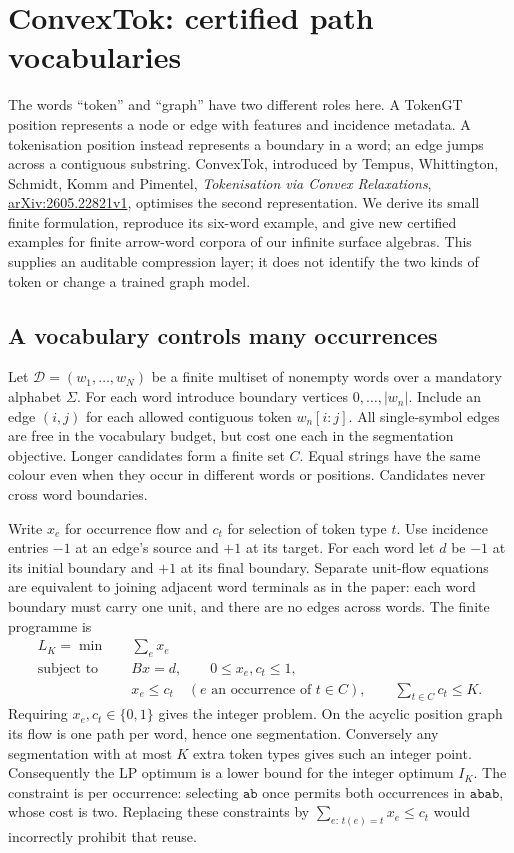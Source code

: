 \section{ConvexTok: certified path vocabularies}
\label{convextok:section}
The words ``token'' and ``graph'' have two different roles here. A TokenGT
position represents a node or edge with features and incidence metadata.
A tokenisation position instead represents a boundary in a word; an edge
jumps across a contiguous substring. ConvexTok, introduced by Tempus,
Whittington, Schmidt, Komm and Pimentel,
\emph{Tokenisation via Convex Relaxations},
\href{https://arxiv.org/html/2605.22821v1}{arXiv:2605.22821v1},
optimises the second representation. We derive its small finite
formulation, reproduce its six-word example, and give new certified
examples for finite arrow-word corpora of our infinite surface algebras.
This supplies an auditable compression layer; it does not identify the two
kinds of token or change a trained graph model.

\subsection{A vocabulary controls many occurrences}
Let $\mathcal D=(w_1,\ldots,w_N)$ be a finite multiset of nonempty words over
a mandatory alphabet $\Sigma$. For each word introduce boundary vertices
$0,\ldots,|w_n|$. Include an edge $(i,j)$ for each allowed contiguous token
$w_n[i:j]$. All single-symbol edges are free in the vocabulary budget,
but cost one each in the segmentation objective. Longer candidates form
a finite set $C$. Equal strings have the same colour even when they occur
in different words or positions. Candidates never cross word boundaries.

Write $x_e$ for occurrence flow and $c_t$ for selection of token type $t$.
Use incidence entries $-1$ at an edge's source and $+1$ at its target.
For each word let $d$ be $-1$ at its initial boundary and $+1$ at its final
boundary. Separate unit-flow equations are equivalent to joining adjacent
word terminals as in the paper: each word boundary must carry one unit,
and there are no edges across words. The finite programme is
\begin{equation}\label{convextok:lp}
 \begin{aligned}
 L_K=\min\quad &\sum_e x_e\\
 \text{subject to}\quad &Bx=d,\qquad 0\le x_e,c_t\le1,\\
 &x_e\le c_t\quad(e\text{ an occurrence of }t\in C),\qquad
 \sum_{t\in C}c_t\le K.
 \end{aligned}
\end{equation}
Requiring $x_e,c_t\in\{0,1\}$ gives the integer problem. On the acyclic
position graph its flow is one path per word, hence one segmentation.
Conversely any segmentation with at most $K$ extra token types gives such
an integer point. Consequently the LP optimum is a lower bound for the
integer optimum $I_K$. The constraint is per occurrence: selecting
$\mathtt{ab}$ once permits both occurrences in $\mathtt{abab}$, whose
cost is two. Replacing these constraints by
$\sum_{e:\,t(e)=t}x_e\le c_t$ would incorrectly prohibit that reuse.

